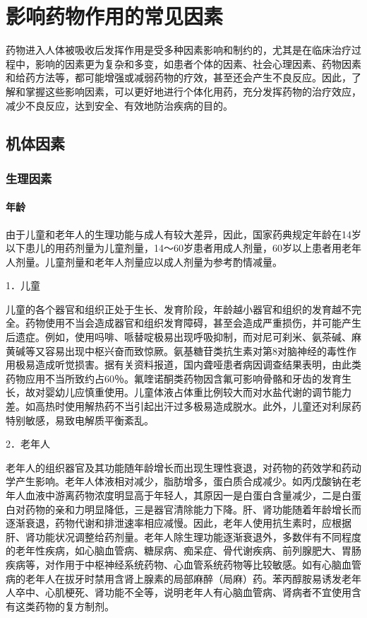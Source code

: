 \chapter{影响药物作用的常见因素}

药物进入人体被吸收后发挥作用是受多种因素影响和制约的，尤其是在临床治疗过程中，影响的因素更为复杂和多变，如患者个体的因素、社会心理因素、药物因素和给药方法等，都可能增强或减弱药物的疗效，甚至还会产生不良反应。因此，了解和掌握这些影响因素，可以更好地进行个体化用药，充分发挥药物的治疗效应，减少不良反应，达到安全、有效地防治疾病的目的。

\section{机体因素}

\subsection{生理因素}

\subsubsection{年龄}

由于儿童和老年人的生理功能与成人有较大差异，因此，国家药典规定年龄在14岁以下患儿的用药剂量为儿童剂量，14～60岁患者用成人剂量，60岁以上患者用老年人剂量。儿童剂量和老年人剂量应以成人剂量为参考酌情减量。

1．儿童

儿童的各个器官和组织正处于生长、发育阶段，年龄越小器官和组织的发育越不完全。药物使用不当会造成器官和组织发育障碍，甚至会造成严重损伤，并可能产生后遗症。例如，使用吗啡、哌替啶极易出现呼吸抑制，而对尼可刹米、氨茶碱、麻黄碱等又容易出现中枢兴奋而致惊厥。氨基糖苷类抗生素对第8对脑神经的毒性作用极易造成听觉损害。据有关资料报道，国内聋哑患者病因调查结果表明，由此类药物应用不当所致约占60％。氟喹诺酮类药物因含氟可影响骨骼和牙齿的发育生长，故对婴幼儿应慎重使用。儿童体液占体重比例较大而对水盐代谢的调节能力差。如高热时使用解热药不当引起出汗过多极易造成脱水。此外，儿童还对利尿药特别敏感，易致电解质平衡紊乱。

2．老年人

老年人的组织器官及其功能随年龄增长而出现生理性衰退，对药物的药效学和药动学产生影响。老年人体液相对减少，脂肪增多，蛋白质合成减少。如丙戊酸钠在老年人血液中游离药物浓度明显高于年轻人，其原因一是白蛋白含量减少，二是白蛋白对药物的亲和力明显降低，三是器官清除能力下降。肝、肾功能随着年龄增长而逐渐衰退，药物代谢和排泄速率相应减慢。因此，老年人使用抗生素时，应根据肝、肾功能状况调整给药剂量。老年人除生理功能逐渐衰退外，多数伴有不同程度的老年性疾病，如心脑血管病、糖尿病、痴呆症、骨代谢疾病、前列腺肥大、胃肠疾病等，对作用于中枢神经系统药物、心血管系统药物等比较敏感。如有心脑血管病的老年人在拔牙时禁用含肾上腺素的局部麻醉（局麻）药。苯丙醇胺易诱发老年人卒中、心肌梗死、肾功能不全等，说明老年人有心脑血管病、肾病者不宜使用含有这类药物的复方制剂。

